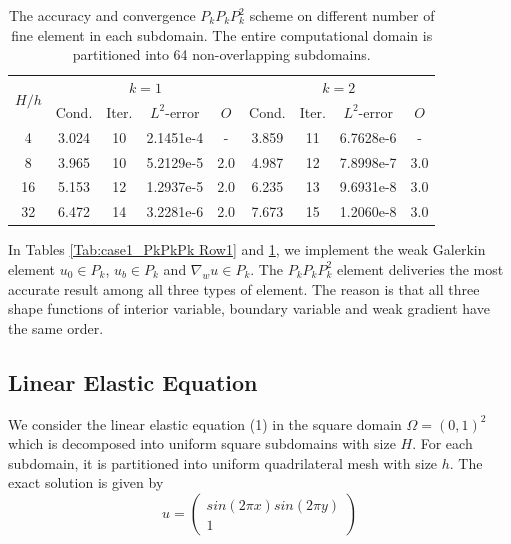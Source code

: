 					\begin{table}[H]
						\vspace{-10pt}
						\setlength{\tabcolsep}{1pt} {
							\vspace{-5pt}
							\begin{center}
								\begin{tabular}{c|cccc|cccc}
									\hline
									\multirow{2}{*}{$H/h$} &\multicolumn{4}{c|}{$k=1$} &\multicolumn{4}{c}{$k=2$}\\ 
									& Cond.   & Iter. &$L^2$-error & $O$  & Cond.   & Iter. &$L^2$-error & $O$ \\
									\hline
									4   &3.024 &10 &2.1451e-4 &-  &3.859 &11 &6.7628e-6 &- \\
									8   &3.965 &10 &5.2129e-5 &2.0  &4.987 &12 &7.8998e-7 &3.0 \\
									16 &5.153 &12 &1.2937e-5 &2.0 &6.235 &13 &9.6931e-8 &3.0 \\
									32 &6.472 &14 &3.2281e-6 &2.0  &7.673 &15 &1.2060e-8 &3.0 \\
									\hline	
								\end{tabular}
							\end{center} }
							\caption{The accuracy and convergence  $P_{k}P_{k}P_{k}^2$ scheme on different number of fine element in each subdomain. The entire computational domain is partitioned into 64 non-overlapping subdomains.}
							\label{Tab:case1_PkPkPk Row2}
						\end{table}
						
						In Tables \ref{Tab:case1_PkPkPk Row1} and \ref{Tab:case1_PkPkPk Row2}, we implement the weak Galerkin element $ u_{0} \in P_{k} $, $ u_{b} \in P_{k} $ and $ \nabla_{w} u \in P_{k} $. The $ P_k P_k P_k^2 $ element deliveries the most accurate result among all three types of element. The reason is that all three shape functions of interior variable, boundary variable and weak gradient have the same order. 
			
			
			\subsection{Linear Elastic Equation}
			
			We consider the linear elastic equation (1) in the square domain $ \Omega = (0, 1)^{2} $ which is decomposed into uniform square subdomains with size $ H $. For each subdomain, it is partitioned into uniform quadrilateral mesh with size $ h $. The exact solution is given by
			\begin{equation}
			u = \begin{pmatrix}
			sin(2\pi x)sin(2\pi y) \\ 1
			\end{pmatrix}
			\end{equation}
			
